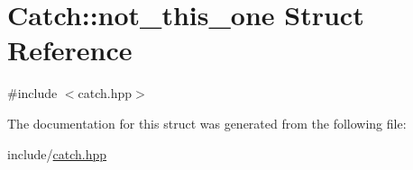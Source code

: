 \hypertarget{struct_catch_1_1not__this__one}{}\section{Catch\+::not\+\_\+this\+\_\+one Struct Reference}
\label{struct_catch_1_1not__this__one}


{\ttfamily \#include $<$catch.\+hpp$>$}



The documentation for this struct was generated from the following file\+:\begin{DoxyCompactItemize}
\item 
include/\mbox{\hyperlink{catch_8hpp}{catch.\+hpp}}\end{DoxyCompactItemize}
